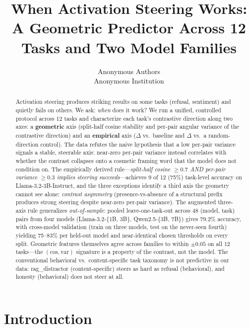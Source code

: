 \documentclass{article}
\title{When Activation Steering Works:\\
       A Geometric Predictor Across 12 Tasks and Two Model Families}
\author{\name Anonymous Authors \\
        \addr Anonymous Institution}
\begin{document}
\maketitle

\begin{abstract}
Activation steering produces striking results on some tasks (refusal,
sentiment) and quietly fails on others. We ask: \emph{when} does it
work? We run a unified, controlled protocol across 12 tasks and
characterize each task's contrastive direction along two axes: a
\textbf{geometric} axis (split-half cosine stability and per-pair
angular variance of the contrastive direction) and an \textbf{empirical}
axis ($\Delta$ vs.~baseline and $\Delta$ vs.~a random-direction control).
The data refutes the naive hypothesis that a low per-pair variance
signals a stable, steerable axis: near-zero per-pair variance instead
correlates with whether the contrast collapses onto a cosmetic
framing word that the model does not condition on. The empirically
derived rule---\emph{split-half cosine $\geq 0.7$ AND per-pair
variance $\geq 0.3$ implies steering succeeds}---achieves 9 of 12
(75\%) task-level accuracy on Llama-3.2-3B-Instruct, and the
three exceptions identify a third axis the geometry cannot see alone:
\emph{contrast asymmetry} (presence-vs-absence of a structural prefix
produces strong steering despite near-zero per-pair variance). The
augmented three-axis rule generalizes \emph{out-of-sample}: pooled
leave-one-task-out across 48 (model, task) pairs from four models
(Llama-3.2-\{1B, 3B\}, Qwen2.5-\{3B, 7B\}) gives 79.2\% accuracy,
with cross-model validation (train on three models, test on the
never-seen fourth) yielding 75--83\% per held-out model and
near-identical chosen thresholds on every split. Geometric features
themselves agree across families to within $\pm 0.05$ on all 12
tasks---the $(\text{cos}, \text{var})$ signature is a property of the
contrast, not the model. The conventional behavioral
vs.~content-specific task taxonomy is not predictive in our data:
rag\_distractor (content-specific) steers as hard as refusal
(behavioral), and honesty (behavioral) does not steer at all.
\end{abstract}

\section{Introduction}
\end{document}

